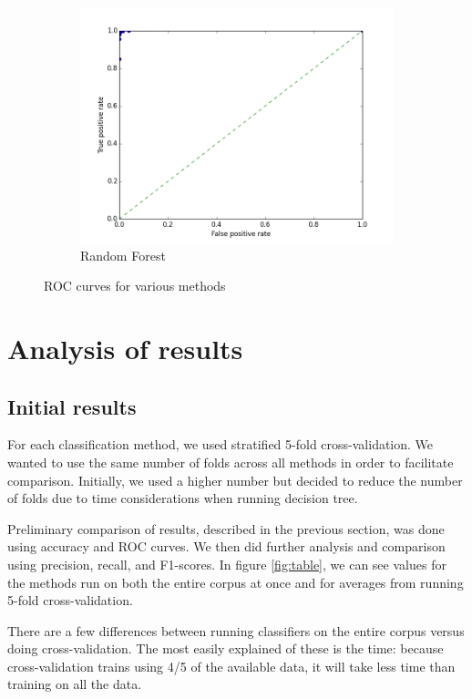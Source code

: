 \documentclass{article} %
\begin{document}
\begin{figure}[h]
\begin{subfigure}{0.3\textwidth}
    \includegraphics[width=\textwidth]{random_forest_roc_curve.png}
    \caption{Random Forest}
  \end{subfigure}
  \caption{ROC curves for various methods}
  \label{fig:roc}
\end{figure}

\section{Analysis of results}
\subsection{Initial results}
For each classification method, we used stratified 5-fold cross-validation. We wanted to use the same number of folds across all methods in order to facilitate comparison. Initially, we used a higher number but decided to reduce the number of folds due to time considerations when running decision tree. 

Preliminary comparison of results, described in the previous section, was done using accuracy and ROC curves. We then did further analysis and comparison using precision, recall, and F1-scores. In figure \ref{fig:table}, we can see values for the methods run on both the entire corpus at once and for averages from running 5-fold cross-validation. 

There are a few differences between running classifiers on the entire corpus versus doing cross-validation. The most easily explained of these is the time: because cross-validation trains using 4/5 of the available data, it will take less time than training on all the data. 
\end{document}

